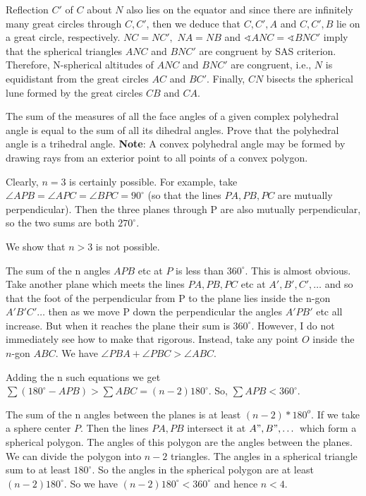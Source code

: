 \begin{solution}[name={Solution by Luis González}] 
	Reflection $C'$ of $C$ about $N$ also lies on the equator and since there are infinitely many great circles through $C,C'$, then we deduce that $C,C',A$ and $C,C',B$ lie on a great circle, respectively. $NC=NC',$ $NA=NB$ and $\sphericalangle ANC=\sphericalangle BNC'$ imply that the spherical triangles $ANC$ and $BNC'$ are congruent by SAS criterion. Therefore,  N-spherical altitudes of $ANC$ and $BNC'$ are congruent, i.e., $N$ is equidistant from the great circles $AC$ and $BC'$. Finally, $CN$ bisects the spherical lune formed by the great circles $CB$ and $CA$.
\end{solution}




\begin{question}[name={1981 USAMO}]
	The sum of the measures of all the face angles of a given complex polyhedral angle is equal to the sum of all its dihedral angles. Prove that the polyhedral angle is a trihedral angle. \textbf{Note}: A convex polyhedral angle may be formed by drawing rays from an exterior point to all points of a convex polygon.
\end{question}

\begin{solution}[name={Solution from Kalva}] 
	Clearly, $n = 3$ is certainly possible. For example, take $\angle {APB} = \angle {APC} = \angle {BPC} = 90^{\circ}$ (so that the lines $PA, PB, PC$ are mutually perpendicular). Then the three planes through P are also mutually perpendicular, so the two sums are both $270^{\circ}$.
	
	We show that $n > 3$ is not possible.
	
	The sum of the n angles $APB$ etc at $P$ is less than $360^\circ$. This is almost obvious. Take another plane which meets the lines $PA, PB, PC$ etc at $A', B', C', \dots$ and so that the foot of the perpendicular from P to the plane lies inside the n-gon $A'B'C' \dots$ then as we move P down the perpendicular the angles $A'PB'$ etc all increase. But when it reaches the plane their sum is $360^\circ$. However, I do not immediately see how to make that rigorous. Instead, take any point $O$ inside the $n$-gon $ABC$. We have $\angle PBA + \angle PBC > \angle ABC$.
	
	Adding the n such equations we get $\sum(180^\circ - APB) > \sum ABC = (n - 2) 180^\circ$. So, $\sum APB < 360^\circ$.
	
	The sum of the n angles between the planes is at least $(n - 2)*180^o$. If we take a sphere center $P$. Then the lines $PA, PB$ intersect it at $A", B", \dots$ which form a spherical polygon. The angles of this polygon are the angles between the planes. We can divide the polygon into $n - 2$ triangles. The angles in a spherical triangle sum to at least $180^\circ$. So the angles in the spherical polygon are at least $(n - 2) 180^\circ$. So we have $(n - 2) 180^\circ < 360^\circ$ and hence $n < 4$.
\end{solution}




